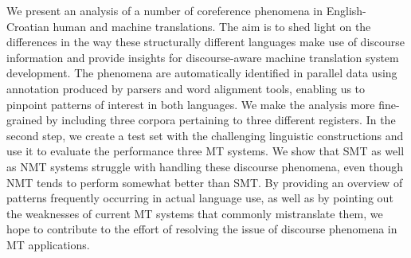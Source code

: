 We present an analysis of a number of coreference phenomena in English-Croatian human and machine translations. The aim is to shed light on the differences in the way these structurally different languages make use of discourse information and provide insights for discourse-aware machine translation system development. The phenomena are automatically identified in parallel data using annotation produced by parsers and word alignment tools, enabling us to pinpoint patterns of interest in both languages. We make the analysis more fine-grained by including three corpora pertaining to three different registers. In the second step, we create a test set with the challenging linguistic constructions and use it to evaluate the performance three MT systems. We show that SMT as well as NMT systems struggle with handling these discourse phenomena, even though NMT tends to perform somewhat better than SMT. By providing an overview of patterns frequently occurring in actual language use, as well as by pointing out the weaknesses of current MT systems that commonly mistranslate them, we hope to contribute to the effort of resolving the issue of discourse phenomena in MT applications.
